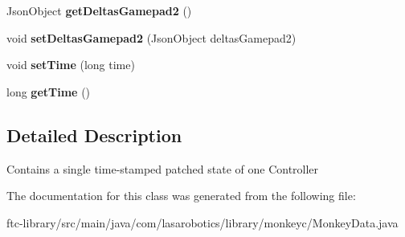 \begin{DoxyCompactItemize}
\item 
\hypertarget{classcom_1_1lasarobotics_1_1library_1_1monkeyc_1_1_monkey_data_aca1aba18ede7b1a10fb8ec65bb99ba95}{}Json\+Object {\bfseries get\+Deltas\+Gamepad2} ()\label{classcom_1_1lasarobotics_1_1library_1_1monkeyc_1_1_monkey_data_aca1aba18ede7b1a10fb8ec65bb99ba95}

\item 
\hypertarget{classcom_1_1lasarobotics_1_1library_1_1monkeyc_1_1_monkey_data_afc0d5a15c6cbc2bc55d2d8f2f00418f7}{}void {\bfseries set\+Deltas\+Gamepad2} (Json\+Object deltas\+Gamepad2)\label{classcom_1_1lasarobotics_1_1library_1_1monkeyc_1_1_monkey_data_afc0d5a15c6cbc2bc55d2d8f2f00418f7}

\item 
\hypertarget{classcom_1_1lasarobotics_1_1library_1_1monkeyc_1_1_monkey_data_ab5dd5e5be346d334900459e3481d9347}{}void {\bfseries set\+Time} (long time)\label{classcom_1_1lasarobotics_1_1library_1_1monkeyc_1_1_monkey_data_ab5dd5e5be346d334900459e3481d9347}

\item 
\hypertarget{classcom_1_1lasarobotics_1_1library_1_1monkeyc_1_1_monkey_data_a5a29849d0d744c500771bd5788f2857e}{}long {\bfseries get\+Time} ()\label{classcom_1_1lasarobotics_1_1library_1_1monkeyc_1_1_monkey_data_a5a29849d0d744c500771bd5788f2857e}

\end{DoxyCompactItemize}


\subsection{Detailed Description}
Contains a single time-\/stamped patched state of one Controller 

The documentation for this class was generated from the following file\+:\begin{DoxyCompactItemize}
\item 
ftc-\/library/src/main/java/com/lasarobotics/library/monkeyc/Monkey\+Data.\+java\end{DoxyCompactItemize}
